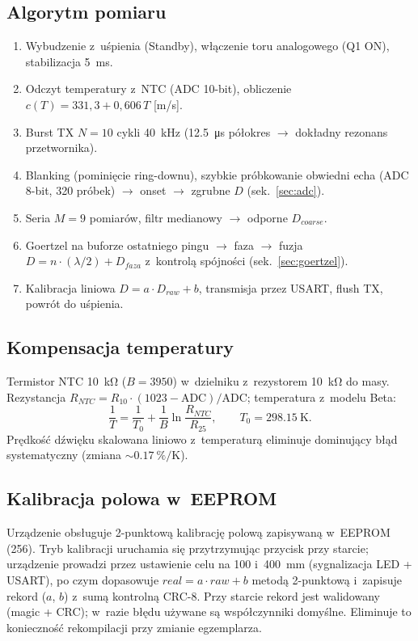 \documentclass[a4paper,11pt]{article}
\begin{document}
\subsection{Algorytm pomiaru}

\begin{enumerate}[nosep]
	\item Wybudzenie z~uśpienia (Standby), włączenie toru analogowego (Q1 ON),
	stabilizacja \SI{5}{\milli\second}.
	\item Odczyt temperatury z~NTC (ADC 10-bit), obliczenie
	$c(T)=331{,}3+0{,}606\,T$ [m/s].
	\item Burst TX $N=10$ cykli \SI{40}{\kilo\hertz} (\SI{12,5}{\micro\second}
	półokres $\to$ dokładny rezonans przetwornika).
	\item Blanking (pominięcie ring-downu), szybkie próbkowanie obwiedni echa
	(ADC 8-bit, \SI{320}{} próbek) $\to$ onset $\to$ zgrubne $D$ (sek.~\ref{sec:adc}).
	\item Seria $M=9$ pomiarów, filtr medianowy $\to$ odporne $D_{coarse}$.
	\item Goertzel na buforze ostatniego pingu $\to$ faza $\to$ fuzja
	$D = n\cdot(\lambda/2)+D_{faza}$ z~kontrolą spójności (sek.~\ref{sec:goertzel}).
	\item Kalibracja liniowa $D = a\cdot D_{raw}+b$, transmisja przez USART,
	flush TX, powrót do uśpienia.
\end{enumerate}

\subsection{Kompensacja temperatury}

Termistor NTC \SI{10}{\kilo\ohm} ($B=3950$) w~dzielniku z~rezystorem
\SI{10}{\kilo\ohm} do masy. Rezystancja $R_{NTC}=R_{10}\cdot(1023-\text{ADC})/\text{ADC}$;
temperatura z~modelu Beta:
\begin{equation}
	\frac{1}{T} = \frac{1}{T_0} + \frac{1}{B}\ln\!\frac{R_{NTC}}{R_{25}},
	\qquad T_0 = \SI{298,15}{\kelvin}.
\end{equation}
Prędkość dźwięku skalowana liniowo z~temperaturą eliminuje dominujący błąd
systematyczny (zmiana $\sim\SI{0,17}{\percent}/\si{\kelvin}$).

\subsection{Kalibracja polowa w~EEPROM}
\label{sec:eeprom}

Urządzenie obsługuje 2-punktową kalibrację polową zapisywaną w~EEPROM
(\SI{256}{\byte}). Tryb kalibracji uruchamia się przytrzymując przycisk przy
starcie; urządzenie prowadzi przez ustawienie celu na \SI{100}{} i~\SI{400}{\milli\metre}
(sygnalizacja LED + USART), po czym dopasowuje $real = a\cdot raw + b$ metodą
2-punktową i~zapisuje rekord ($a$, $b$) z~sumą kontrolną CRC-8. Przy starcie
rekord jest walidowany (magic + CRC); w~razie błędu używane są współczynniki
domyślne. Eliminuje to konieczność rekompilacji przy zmianie egzemplarza.
\end{document}
